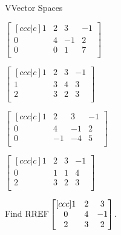 \documentclass{article}[12pt]
\begin{document}
\begin{module}{V}{Vector Spaces}
\begin{readinessAssuranceTest}
    \begin{multicols}{4}
    \begin{readinessAssuranceTestChoices}
    \item
      \(
        \begin{bmatrix}[ccc|c]
          1 & 2 & 3 & -1 \\
          0 & 4 & -1 & 2 \\
          0 & 0 & 1 & 7\\
        \end{bmatrix}
      \)
    \item
      \(
        \begin{bmatrix}[ccc|c]
          1 & 2 & 3 & -1 \\
          1 & 3 & 4 & 3 \\
          2 & 3 & 2 & 3\\
        \end{bmatrix}
      \)
    \item
      \(
        \begin{bmatrix}[ccc|c]
          1 & 2 & 3 & -1 \\
          0 & 4 & -1 & 2 \\
          0 & -1 & -4 & 5 \\
        \end{bmatrix}
      \) %
    \item
      \(
        \begin{bmatrix}[ccc|c]
          1 & 2 & 3 & -1 \\
          0 & 1 & 1 & 4 \\
          2 & 3 & 2 & 3 \\
        \end{bmatrix}
      \)
    \end{readinessAssuranceTestChoices}
    \end{multicols}

  \item Find
    \(\operatorname{RREF}
      \begin{bmatrix}[ccc]
        1 & 2 & 3 \\
        0 & 4 & -1 \\
        2 & 3 & 2 \\
      \end{bmatrix}
    \).


\end{readinessAssuranceTest}
\end{module}
\end{document}
